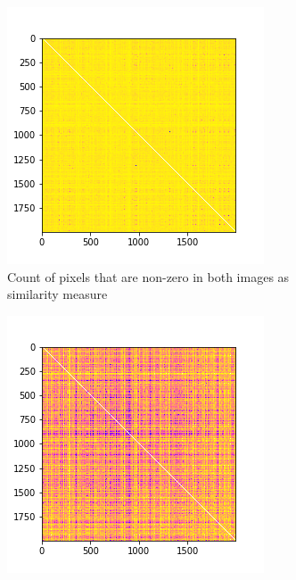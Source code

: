 \documentclass[10pt,a4paper, nocenter]{report}
\begin{document}
\begin{enumerate}
        \begin{figure}[h]
            \begin{center}
                \begin{subfigure}[b]{0.3\textwidth}
                    \centering
                    \includegraphics[width=\textwidth]{../../images/w_0norm.png}
                    \caption{Count of pixels that are non-zero in both images as similarity measure}
                    \label{fig:w_0norm}
                \end{subfigure}           
                \begin{subfigure}[b]{0.3\textwidth}
                    \centering
                    \includegraphics[width=\textwidth]{../../images/w_2norm.png}

\end{subfigure}
\end{center}
\end{figure}
\end{enumerate}
\end{document}
